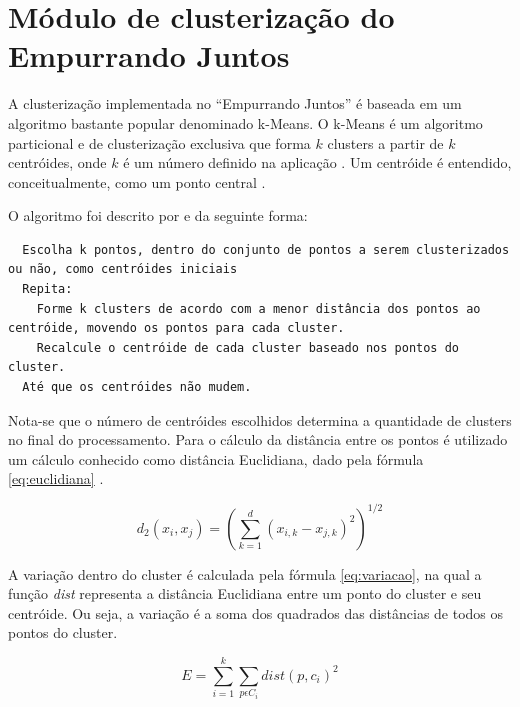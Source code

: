 \section{Módulo de clusterização do Empurrando Juntos}

A clusterização implementada no ``Empurrando Juntos'' é baseada em um algoritmo bastante popular denominado k-Means. O k-Means é um
algoritmo particional e de clusterização exclusiva que forma $k$ clusters a partir de $k$ centróides, onde $k$ é um número definido na aplicação 
\cite{clustering_review, tan2013data}. Um centróide é entendido, conceitualmente, como um ponto central \cite{han2011data}.

O algoritmo foi descrito por  e  da seguinte forma:


\begin{center}
  \lstset{language=HTML, numbers=left, stepnumber=1}
  \begin{lstlisting}
  Escolha k pontos, dentro do conjunto de pontos a serem clusterizados ou não, como centróides iniciais
  Repita:
    Forme k clusters de acordo com a menor distância dos pontos ao centróide, movendo os pontos para cada cluster.
    Recalcule o centróide de cada cluster baseado nos pontos do cluster.
  Até que os centróides não mudem.
  \end{lstlisting}
\end{center}


Nota-se que o número de centróides escolhidos determina a quantidade de clusters no final do processamento.
Para o cálculo da distância entre os pontos é utilizado um cálculo conhecido como distância Euclidiana, 
dado pela fórmula \ref{eq:euclidiana} \cite{clustering_review, tan2013data, han2011data}.

\begin{equation} \label{eq:euclidiana}
  d_{2}(x_i, x_j) = (\sum_{k=1}^{d} (x_{i,k} - x_{j,k})^2)^{1/2}
\end{equation}

A variação dentro do cluster é calculada pela fórmula \ref{eq:variacao}, na qual a 
função \textit{dist} representa a distância Euclidiana entre um ponto do
cluster e seu centróide. Ou seja, a variação é a soma dos quadrados
das distâncias de todos os pontos do cluster.

\begin{equation} \label{eq:variacao}
  E = \sum_{i=1}^{k} \sum_{p \epsilon C_{i}} dist(p, c_i)^2
\end{equation}

